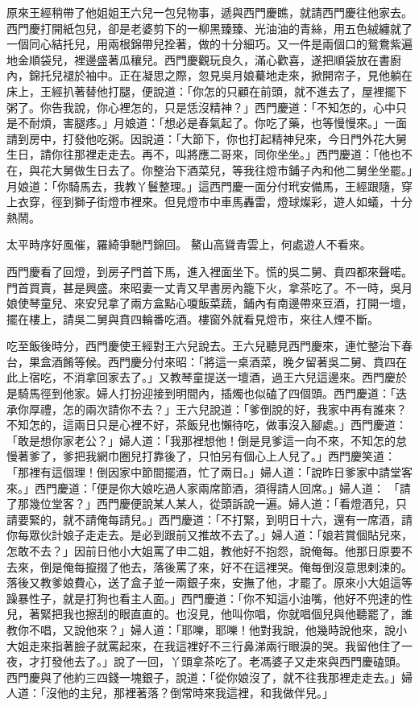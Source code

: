 原來王經稍帶了他姐姐王六兒一包兒物事，遞與西門慶瞧，就請西門慶往他家去。西門慶打開紙包兒，卻是老婆剪下的一柳黑臻臻、光油油的青絲，用五色絨纏就了一個同心結托兒，用兩根錦帶兒拴著，做的十分細巧。又一件是兩個口的鴛鴦紫遍地金順袋兒，裡邊盛著瓜穰兒。西門慶觀玩良久，滿心歡喜，遂把順袋放在書廚內，錦托兒褪於袖中。正在凝思之際，忽見吳月娘驀地走來，掀開帘子，見他躺在床上，王經扒著替他打腿，便說道：「你怎的只顧在前頭，就不進去了，屋裡擺下粥了。你告我說，你心裡怎的，只是恁沒精神？」西門慶道：「不知怎的，心中只是不耐煩，害腿疼。」月娘道：「想必是春氣起了。你吃了藥，也等慢慢來。」一面請到房中，打發他吃粥。因說道：「大節下，你也打起精神兒來，今日門外花大舅生日，請你往那裡走走去。再不，叫將應二哥來，同你坐坐。」西門慶道：「他也不在，與花大舅做生日去了。你整治下酒菜兒，等我往燈市鋪子內和他二舅坐坐罷。」月娘道：「你騎馬去，我教丫鬟整理。」這西門慶一面分付玳安備馬，王經跟隨，穿上衣穿，徑到獅子街燈市裡來。但見燈市中車馬轟雷，燈球燦彩，遊人如蟻，十分熱鬧。

太平時序好風催，羅綺爭馳鬥錦回。
鰲山高聳青雲上，何處遊人不看來。

西門慶看了回燈，到房子門首下馬，進入裡面坐下。慌的吳二舅、賁四都來聲喏。門首買賣，甚是興盛。來昭妻一丈青又早書房內籠下火，拿茶吃了。不一時，吳月娘使琴童兒、來安兒拿了兩方盒點心嗄飯菜蔬，鋪內有南邊帶來豆酒，打開一壇，擺在樓上，請吳二舅與賁四輪番吃酒。樓窗外就看見燈市，來往人煙不斷。

吃至飯後時分，西門慶使王經對王六兒說去。王六兒聽見西門慶來，連忙整治下春台，果盒酒餚等候。西門慶分付來昭：「將這一桌酒菜，晚夕留著吳二舅、賁四在此上宿吃，不消拿回家去了。」又教琴童提送一壇酒，過王六兒這邊來。西門慶於是騎馬徑到他家。婦人打扮迎接到明間內，插燭也似磕了四個頭。西門慶道：「迭承你厚禮，怎的兩次請你不去？」王六兒說道：「爹倒說的好，我家中再有誰來？不知怎的，這兩日只是心裡不好，茶飯兒也懶待吃，做事沒入腳處。」西門慶道： 「敢是想你家老公？」婦人道：「我那裡想他！倒是見爹這一向不來，不知怎的怠慢著爹了，爹把我網巾圈兒打靠後了，只怕另有個心上人兒了。」西門慶笑道： 「那裡有這個理！倒因家中節間擺酒，忙了兩日。」婦人道：「說昨日爹家中請堂客來。」西門慶道：「便是你大娘吃過人家兩席節酒，須得請人回席。」婦人道： 「請了那幾位堂客？」西門慶便說某人某人，從頭訴說一遍。婦人道：「看燈酒兒，只請要緊的，就不請俺每請兒。」西門慶道：「不打緊，到明日十六，還有一席酒，請你每眾伙計娘子走走去。是必到跟前又推故不去了。」婦人道：「娘若賞個貼兒來，怎敢不去？」因前日他小大姐罵了申二姐，教他好不抱怨，說俺每。他那日原要不去來，倒是俺每攛掇了他去，落後罵了來，好不在這裡哭。俺每倒沒意思剌涑的。落後又教爹娘費心，送了盒子並一兩銀子來，安撫了他，才罷了。原來小大姐這等躁暴性子，就是打狗也看主人面。」西門慶道：「你不知這小油嘴，他好不兜達的性兒，著緊把我也擦刮的眼直直的。也沒見，他叫你唱，你就唱個兒與他聽罷了，誰教你不唱，又說他來？」婦人道：「耶嚛，耶嚛！他對我說，他幾時說他來，說小大姐走來指著臉子就罵起來，在我這裡好不三行鼻涕兩行眼淚的哭。我留他住了一夜，才打發他去了。」說了一回，丫頭拿茶吃了。老馮婆子又走來與西門慶磕頭。西門慶與了他約三四錢一塊銀子，說道：「從你娘沒了，就不往我那裡走走去。」婦人道：「沒他的主兒，那裡著落？倒常時來我這裡，和我做伴兒。」


